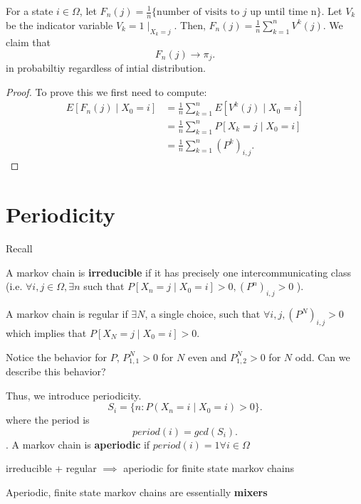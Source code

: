 \documentclass[a4paper]{article}
\begin{document}
\begin{theorem}
  For a state $i \in \Omega$, let  $F_n(j) = \frac{1}{n} \{\text{number of visits to $j$ up until time n}\}$. Let $V_k$ be the indicator variable  $V_k = 1\mid_{X_k = j}$. Then, $F_n(j) = \frac{1}{n} \sum_{k=1}^{n} V^{k}(j)$. We claim that 
   \[
  F_n (j) \to \pi_j
  .\] 
  in probabiltiy regardless of intial distribution.

  \begin{proof}
    To prove this we first need to compute:
    \begin{align*} 
      E[F_n(j) \mid X_0 =i] &= \frac{1}{n} \sum_{k=1}^{n} E[V^{k}\left( j \right) \mid X_0 =i] \\
                            &= \frac{1}{n} \sum_{k=1}^{n} P[X_k = j \mid X_0 =i] \\
                            &= \frac{1}{n} \sum_{k=1}^{n} (P^{k})_{i,j}
    .\end{align*}

  \end{proof}
\end{theorem}

\section{Periodicity}
Recall 
\begin{definition}
  A markov chain is \textbf{irreducible} if it has precisely one intercommunicating class (i.e. $\forall i,j \in \Omega, \exists n$ such that $P[X_n =j \mid  X_0 =i] > 0, (P^{n})_{i,j} > 0$ ).
\end{definition}

\begin{definition}
  A markov chain is regular if $\exists N$, a single choice, such that $\forall i,j, (P^{N})_{i,j} > 0$ which implies that $P[X_N = j \mid X_0=i] > 0$.    
\end{definition}

\begin{note}
  Notice the behavior for $P$,  $P^{N}_{1,1} > 0$ for $N$ even and $P^{N}_{1,2} > 0$ for $N$ odd. Can we describe this behavior?
\end{note}

\begin{definition}
  Thus, we introduce periodicity.
  \[
  S_i = \{n : P(X_n = i \mid X_0 = i) > 0\} 
  .\] 
  where the period is
  \[
    period(i) = gcd(S_i)
  .\]. A markov chain is \textbf{aperiodic} if $period(i) = 1 \forall i \in \Omega$  
\end{definition}

\begin{theorem}
 irreducible + regular $\implies$ aperiodic for finite state markov chains 
\end{theorem}

\begin{remark}
  Aperiodic, finite state markov chains are essentially \textbf{mixers}
\end{remark}
\end{document}
